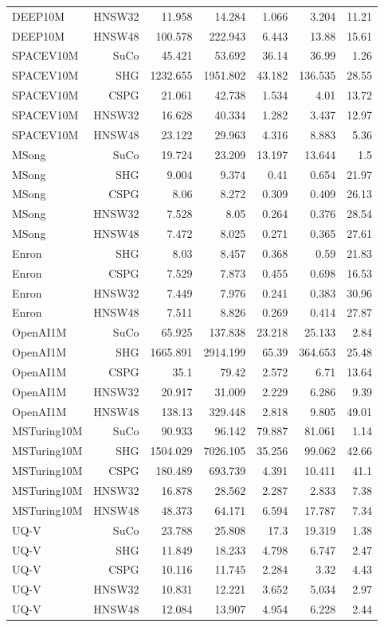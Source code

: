 \begin{table}[t]
\begin{tabular}{lrrrrrr}
DEEP10M & HNSW32 & 11.958 & 14.284 & 1.066 & 3.204 & 11.21 \\
DEEP10M & HNSW48 & 100.578 & 222.943 & 6.443 & 13.88 & 15.61 \\
SPACEV10M & SuCo & 45.421 & 53.692 & 36.14 & 36.99 & 1.26 \\
SPACEV10M & SHG & 1232.655 & 1951.802 & 43.182 & 136.535 & 28.55 \\
SPACEV10M & CSPG & 21.061 & 42.738 & 1.534 & 4.01 & 13.72 \\
SPACEV10M & HNSW32 & 16.628 & 40.334 & 1.282 & 3.437 & 12.97 \\
SPACEV10M & HNSW48 & 23.122 & 29.963 & 4.316 & 8.883 & 5.36 \\
MSong & SuCo & 19.724 & 23.209 & 13.197 & 13.644 & 1.5 \\
MSong & SHG & 9.004 & 9.374 & 0.41 & 0.654 & 21.97 \\
MSong & CSPG & 8.06 & 8.272 & 0.309 & 0.409 & 26.13 \\
MSong & HNSW32 & 7.528 & 8.05 & 0.264 & 0.376 & 28.54 \\
MSong & HNSW48 & 7.472 & 8.025 & 0.271 & 0.365 & 27.61 \\
Enron & SHG & 8.03 & 8.457 & 0.368 & 0.59 & 21.83 \\
Enron & CSPG & 7.529 & 7.873 & 0.455 & 0.698 & 16.53 \\
Enron & HNSW32 & 7.449 & 7.976 & 0.241 & 0.383 & 30.96 \\
Enron & HNSW48 & 7.511 & 8.826 & 0.269 & 0.414 & 27.87 \\
OpenAI1M & SuCo & 65.925 & 137.838 & 23.218 & 25.133 & 2.84 \\
OpenAI1M & SHG & 1665.891 & 2914.199 & 65.39 & 364.653 & 25.48 \\
OpenAI1M & CSPG & 35.1 & 79.42 & 2.572 & 6.71 & 13.64 \\
OpenAI1M & HNSW32 & 20.917 & 31.009 & 2.229 & 6.286 & 9.39 \\
OpenAI1M & HNSW48 & 138.13 & 329.448 & 2.818 & 9.805 & 49.01 \\
MSTuring10M & SuCo & 90.933 & 96.142 & 79.887 & 81.061 & 1.14 \\
MSTuring10M & SHG & 1504.029 & 7026.105 & 35.256 & 99.062 & 42.66 \\
MSTuring10M & CSPG & 180.489 & 693.739 & 4.391 & 10.411 & 41.1 \\
MSTuring10M & HNSW32 & 16.878 & 28.562 & 2.287 & 2.833 & 7.38 \\
MSTuring10M & HNSW48 & 48.373 & 64.171 & 6.594 & 17.787 & 7.34 \\
UQ-V & SuCo & 23.788 & 25.808 & 17.3 & 19.319 & 1.38 \\
UQ-V & SHG & 11.849 & 18.233 & 4.798 & 6.747 & 2.47 \\
UQ-V & CSPG & 10.116 & 11.745 & 2.284 & 3.32 & 4.43 \\
UQ-V & HNSW32 & 10.831 & 12.221 & 3.652 & 5.034 & 2.97 \\
UQ-V & HNSW48 & 12.084 & 13.907 & 4.954 & 6.228 & 2.44 \\
\bottomrule
\end{tabular}
\end{table}
